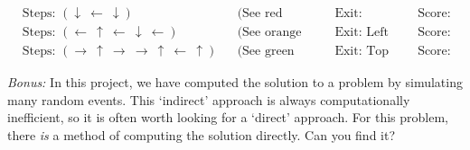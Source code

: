 \begin{align*}
&\text{Steps: }  (\downarrow \ \leftarrow \ \downarrow) &&\text{(See red path)} && \text{Exit: Bottom} && \text{Score: 0}\\
&\text{Steps: }  (\leftarrow \ \uparrow \ \leftarrow \ \downarrow \ \leftarrow) &&\text{(See orange path)} && \text{Exit: Left} && \text{Score: 0}\\
&\text{Steps: }  (\rightarrow \ \uparrow \ \rightarrow \ \rightarrow \ \uparrow \ \leftarrow \ \uparrow) &&\text{(See green path)}&& \text{Exit: Top} && \text{Score: 1}
\end{align*}



\noindent\textit{Bonus:} In this project, we have computed the solution to a problem by simulating many random events. This `indirect' approach is always computationally inefficient, so it is often worth looking for a `direct' approach. For this problem, there \textit{is} a method of computing the solution directly. Can you find it?

